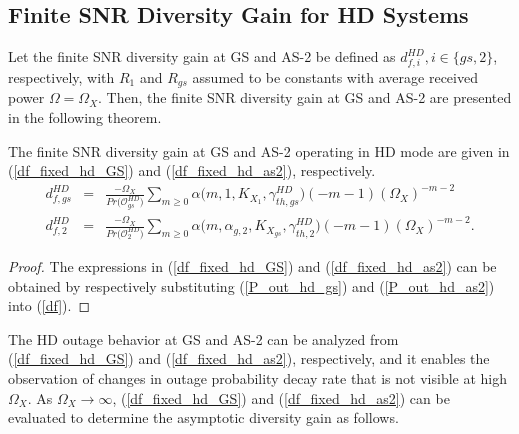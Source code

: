 \subsection{Finite SNR Diversity Gain for HD Systems}

Let the finite SNR diversity gain at GS and AS-2 be defined as $d_{f,i}^{HD}, i \in \{gs,2\}$, respectively, with $R_1$ and $R_{gs}$ assumed to be constants with average received power $\Omega = \Omega_X$. Then, the finite SNR diversity gain at GS and AS-2 are presented in the following theorem.

\begin{theorem}
The finite SNR diversity gain at GS and AS-2 operating in HD mode are given in (\ref{df_fixed_hd_GS}) and (\ref{df_fixed_hd_as2}), respectively.
\begin{eqnarray} 
d_{f,gs}^{HD} & = & \frac{-\Omega_X}{Pr\big(\mathcal{O}_{gs}^{HD}\big)} \sum_{m\geq0} \alpha\big(m,1,K_{X_1},\gamma_{th,gs}^{HD}\big) (-m-1) (\Omega_{X})^{-m-2} \label{df_fixed_hd_GS}\\
d_{f,2}^{HD} & = & \frac{-\Omega_X}{Pr\big(\mathcal{O}_{2}^{HD}\big)} \sum_{m\geq0} \alpha\big(m,\alpha_{g,2},K_{X_{gs}},\gamma_{th,2}^{HD}\big) (-m-1) (\Omega_{X})^{-m-2} \label{df_fixed_hd_as2}.
\end{eqnarray}
\end{theorem}
\begin{proof}
The expressions in (\ref{df_fixed_hd_GS}) and (\ref{df_fixed_hd_as2}) can be obtained by respectively substituting (\ref{P_out_hd_gs}) and (\ref{P_out_hd_as2}) into (\ref{df}).
\end{proof}

The HD outage behavior at GS and AS-2 can be analyzed from (\ref{df_fixed_hd_GS}) and (\ref{df_fixed_hd_as2}), respectively, and it enables the observation of changes in outage probability decay rate that is not visible at high $\Omega_X$. As $\Omega_X \to \infty$, (\ref{df_fixed_hd_GS}) and (\ref{df_fixed_hd_as2}) can be evaluated to determine the asymptotic diversity gain as follows.

